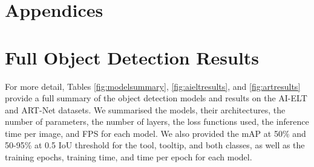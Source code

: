 \section{Appendices}

\appendix

\section{Full Object Detection Results}

For more detail, Tables \ref{fig:modelsummary}, \ref{fig:aieltresults}, and \ref{fig:artresults} provide a full summary of the object detection models and results on the AI-ELT and ART-Net datasets. We summarised the models, their architectures, the number of parameters, the number of layers, the loss functions used, the inference time per image, and FPS for each model. We also provided the mAP at 50\% and 50-95\% at 0.5 IoU threshold for the tool, tooltip, and both classes, as well as the training epochs, training time, and time per epoch for each model.


